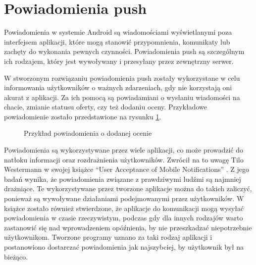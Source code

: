 \section{Powiadomienia push}

Powiadomienia w systemie Android są wiadomościami wyświetlanymi poza interfejsem aplikacji, które mogą stanowić przypomnienia, komunikaty lub zachęty do wykonania pewnych czynności. Powiadomienia push są szczególnym ich rodzajem, który jest wywoływany i przesyłany przez zewnętrzny serwer. 

W stworzonym rozwiązaniu powiadomienia push zostały wykorzystane w celu informowania użytkowników o ważnych zdarzeniach, gdy nie korzystają oni akurat z aplikacji. Za ich pomocą są powiadamiani o wysłaniu wiadomości na chacie, zmianie statusu oferty, czy też dodaniu oceny. Przykładowe powiadomienie zostało przedstawione na rysunku \ref{fig:notification}.


\begin{figure}[ht!]
  \centering
  \caption[Przykład powiadomienia]{Przykład powiadomienia o dodanej ocenie}
  \label{fig:notification}
\end{figure}

Powiadomienia są wykorzystywane przez wiele aplikacji, co może prowadzić do natłoku informacji oraz rozdrażnienia użytkowników. Zwrócił na to uwagę Tilo Westermann w swojej książce \enquote{User Acceptance of Mobile Notifications} \cite{notifications-acceptance}. Z jego badań wynika, że powiadomienia związane z prawdziwymi ludźmi są najmniej drażniące. Te wykorzystywane przez tworzone aplikacje można do takich zaliczyć, ponieważ są wywoływane działaniami podejmowanymi przez użytkowników. W książce zostało również stwierdzone, że aplikacje do komunikacji mogą wysyłać powiadomienia w czasie rzeczywistym, podczas gdy dla innych rodzajów warto zastanowić się nad wprowadzeniem opóźnienia, by nie przeszkadzać niepotrzebnie użytkownikom. Tworzone programy uznano za taki rodzaj aplikacji i postanowiono dostarczać powiadomienia jak najszybciej, by użytkownik był na bieżąco.

